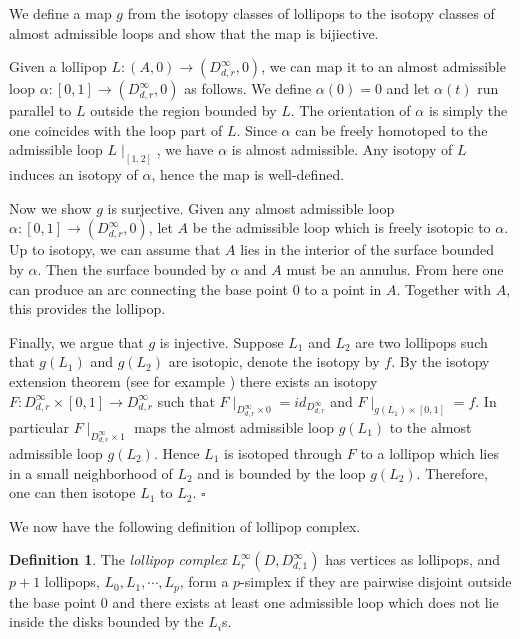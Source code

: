 \documentclass[11pt, a4paper]{amsart}
\theoremstyle{definition}
\newtheorem{defn}[thm]{Definition} %
\def\Proof{\noindent{\bf Proof.}\quad}
\def\qed{\hfill$\square$\smallskip}
\begin{document}
\Proof
We define a map $g$ from the isotopy classes of lollipops to the isotopy classes of almost admissible loops and show that the map is bijiective.

Given a lollipop $L: (A,0) \to (D^{\infty}_{d,r},0)$, we can map it to an almost admissible loop   $\alpha:[0,1] \to (D^{\infty}_{d,r},0) $ as follows. We define $\alpha(0)=0$ and let $\alpha(t)$ run parallel to $L$ outside the region bounded by $L$. The orientation of $\alpha$ is simply the one coincides with the loop part of $L$. Since $\alpha$ can be freely homotoped to the admissible loop $L\mid_{[1,2]}$, we have $\alpha$ is almost admissible. Any isotopy of $L$ induces an isotopy of $\alpha$, hence the map is well-defined.


Now we show $g$ is surjective. Given any almost admissible loop $\alpha:[0,1] \to (D^{\infty}_{d,r},0)$, let $A$ be the admissible loop which is freely isotopic to $\alpha$. Up to isotopy, we can assume that $A$ lies in the interior of the surface bounded by $\alpha$. Then the surface bounded by $\alpha$ and $A$ must be an annulus. From here one can produce an arc connecting the base point $0$ to a point in $A$. Together with $A$, this provides the lollipop. 

Finally, we argue that $g$ is injective. Suppose $L_1$ and $L_2$ are two lollipops such that $g(L_1)$ and $g(L_2)$ are isotopic, denote the isotopy by $f$. By the isotopy extension theorem (see for example \cite[Proposition 1.11]{FaMa11}) there exists an isotopy $F:D^{\infty}_{d,r} \times [0,1] \to D^{\infty}_{d,r}$ such that $F \mid_{D^{\infty}_{d,r} \times 0} = id_{D^{\infty}_{d,r}}$ and $F\mid_{g(L_1)\times [0,1]} =f$. In particular $F\mid_{D^{\infty}_{d,r} \times 1}$ maps the almost admissible loop $g(L_1)$ to the almost admissible loop $g(L_2)$. Hence $L_1$ is isotoped through $F$ to a lollipop which lies in a small neighborhood of $L_2$ and is bounded by the loop $g(L_2)$. Therefore, one can then isotope $L_1$ to $L_2$.
\qed






We now have the following definition of lollipop complex. 

\begin{defn}
The \emph{lollipop complex} $L_r^{\infty}(D,D^{\infty}_{d,1})$ has vertices as lollipops, and $p+1$ lollipops, $L_0,L_1,\cdots, L_p$, form a $p$-simplex if they are pairwise disjoint outside the base point $0$ and there exists at least one admissible loop which does not lie inside the disks bounded by the $L_i$s. 
\end{defn}
\end{document}
